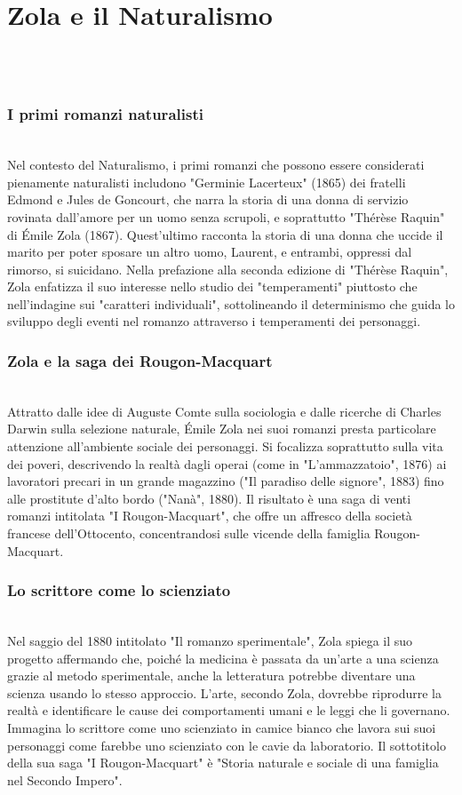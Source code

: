 \documentclass{report}
\begin{document}
\section{Zola e il Naturalismo}
\\

\\
\subsubsection{I  primi  romanzi  naturalisti}
\\
Nel contesto del Naturalismo, i primi romanzi che possono essere considerati pienamente naturalisti includono "Germinie Lacerteux" (1865) dei fratelli Edmond e Jules de Goncourt, che narra la storia di una donna di servizio rovinata dall'amore per un uomo senza scrupoli, e soprattutto "Thérèse Raquin" di Émile Zola (1867). Quest'ultimo racconta la storia di una donna che uccide il marito per poter sposare un altro uomo, Laurent, e entrambi, oppressi dal rimorso, si suicidano. Nella prefazione alla seconda edizione di "Thérèse Raquin", Zola enfatizza il suo interesse nello studio dei "temperamenti" piuttosto che nell'indagine sui "caratteri individuali", sottolineando il determinismo che guida lo sviluppo degli eventi nel romanzo attraverso i temperamenti dei personaggi.
\\
\subsubsection{Zola e la saga dei Rougon-Macquart}
\\
Attratto dalle idee di Auguste Comte sulla sociologia e dalle ricerche di Charles Darwin sulla selezione naturale, Émile Zola nei suoi romanzi presta particolare attenzione all'ambiente sociale dei personaggi. Si focalizza soprattutto sulla vita dei poveri, descrivendo la realtà dagli operai (come in "L’ammazzatoio", 1876) ai lavoratori precari in un grande magazzino ("Il paradiso delle signore", 1883) fino alle prostitute d'alto bordo ("Nanà", 1880). Il risultato è una saga di venti romanzi intitolata "I Rougon-Macquart", che offre un affresco della società francese dell'Ottocento, concentrandosi sulle vicende della famiglia Rougon-Macquart.
\\
\subsubsection{Lo scrittore come lo scienziato}
\\
Nel saggio del 1880 intitolato "Il romanzo sperimentale", Zola spiega il suo progetto affermando che, poiché la medicina è passata da un'arte a una scienza grazie al metodo sperimentale, anche la letteratura potrebbe diventare una scienza usando lo stesso approccio. L'arte, secondo Zola, dovrebbe riprodurre la realtà e identificare le cause dei comportamenti umani e le leggi che li governano. Immagina lo scrittore come uno scienziato in camice bianco che lavora sui suoi personaggi come farebbe uno scienziato con le cavie da laboratorio. Il sottotitolo della sua saga "I Rougon-Macquart" è "Storia naturale e sociale di una famiglia nel Secondo Impero".
\\
\end{document}

